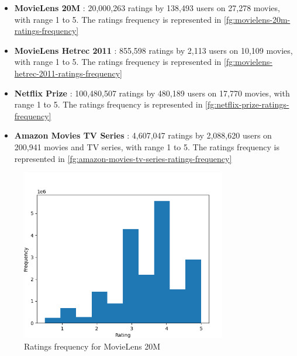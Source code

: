 \begin{itemize}
\item \textbf{MovieLens 20M} \cite{movielens-20m-dataset}: 20,000,263 ratings by 138,493 users on 27,278 movies, with range 1 to 5. The ratings frequency is represented in \autoref{fg:movielens-20m-ratings-frequency}
\item \textbf{MovieLens Hetrec 2011} \cite{grouplens, hetrec-2011}: 855,598 ratings by 2,113 users on 10,109 movies, with range 1 to 5. The ratings frequency is represented in \autoref{fg:movielens-hetrec-2011-ratings-frequency}
\item \textbf{Netflix Prize} \cite{netflix-prize-dataset, 10.1145/1864708.1864721}: 100,480,507 ratings by 480,189 users on 17,770 movies, with range 1 to 5. The ratings frequency is represented in \autoref{fg:netflix-prize-ratings-frequency}
\item \textbf{Amazon Movies TV Series} \cite{amazon-movies-tv-series-dataset}: 4,607,047 ratings by 2,088,620 users on 200,941 movies and TV series, with range 1 to 5. The ratings frequency is represented in \autoref{fg:amazon-movies-tv-series-ratings-frequency}
\end{itemize}
\begin{figure}[hbt!]
\centering
\includegraphics[width=0.8\textwidth]{pictures/movielens-20m-ratings-frequency}
\caption{Ratings frequency for MovieLens 20M}
\label{fg:movielens-20m-ratings-frequency}
\end{figure}
